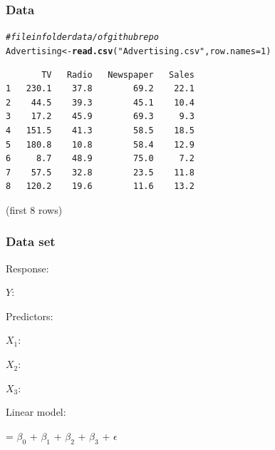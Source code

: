 \documentclass[12pt]{beamer}\usepackage[]{graphicx}\usepackage[]{color}
\makeatletter
\newcommand{\hlnum}[1]{\textcolor[rgb]{0.686,0.059,0.569}{#1}}%
\newcommand{\hlstr}[1]{\textcolor[rgb]{0.192,0.494,0.8}{#1}}%
\newcommand{\hlcom}[1]{\textcolor[rgb]{0.678,0.584,0.686}{\textit{#1}}}%
\newcommand{\hlstd}[1]{\textcolor[rgb]{0.345,0.345,0.345}{#1}}%
\newcommand{\hlkwb}[1]{\textcolor[rgb]{0.69,0.353,0.396}{#1}}%
\newcommand{\hlkwc}[1]{\textcolor[rgb]{0.333,0.667,0.333}{#1}}%
\newcommand{\hlkwd}[1]{\textcolor[rgb]{0.737,0.353,0.396}{\textbf{#1}}}%
\newenvironment{kframe}{%
 \def\at@end@of@kframe{}%
 \ifinner\ifhmode%
  \def\at@end@of@kframe{\end{minipage}}%
  \begin{minipage}{\columnwidth}%
 \fi\fi%
 \def\FrameCommand##1{\hskip\@totalleftmargin \hskip-\fboxsep
 \colorbox{shadecolor}{##1}\hskip-\fboxsep
     \hskip-\linewidth \hskip-\@totalleftmargin \hskip\columnwidth}%
 \MakeFramed {\advance\hsize-\width
   \@totalleftmargin\z@ \linewidth\hsize
   \@setminipage}}%
 {\par\unskip\endMakeFramed%
 \at@end@of@kframe}
\newenvironment{knitrout}{}{} %
\makeatother
\begin{document}
\begin{frame}[fragile]
\frametitle{ Data}

\begin{knitrout}\scriptsize
{}\color{fgcolor}\begin{kframe}
\begin{alltt}
\hlcom{# file in folder data/ of github repo}
\hlstd{Advertising} \hlkwb{<-} \hlkwd{read.csv}\hlstd{(}\hlstr{"Advertising.csv"}\hlstd{,} \hlkwc{row.names} \hlstd{=} \hlnum{1}\hlstd{)}
\end{alltt}
\end{kframe}
\end{knitrout}

\begin{knitrout}\footnotesize
{}\color{fgcolor}\begin{kframe}
\begin{verbatim}
       TV   Radio   Newspaper   Sales
1   230.1    37.8        69.2    22.1
2    44.5    39.3        45.1    10.4
3    17.2    45.9        69.3     9.3
4   151.5    41.3        58.5    18.5
5   180.8    10.8        58.4    12.9
6     8.7    48.9        75.0     7.2
7    57.5    32.8        23.5    11.8
8   120.2    19.6        11.6    13.2
\end{verbatim}
\end{kframe}
\end{knitrout}

{\lolit (first 8 rows)}

\end{frame}


\begin{frame}[fragile]
\frametitle{Data set }

Response:
\bi
  \item  $Y$: 
\ei 

Predictors:
\bi
  \item $X_1$: 
  \item $X_2$: 
  \item $X_3$: 
\ei

\bigskip
Linear model:
\begin{center}
 = $\beta_0$ + $\beta_1$  + $\beta_2$  + $\beta_3$  + $\epsilon$
\end{center}

\end{frame}
\end{document}
